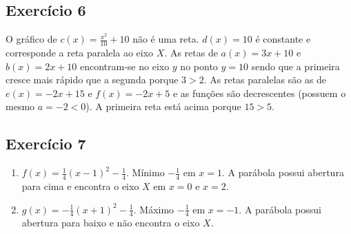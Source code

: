 \subsection*{Exercício 6}

O gráfico de $c(x)=\frac{x^2}{10} + 10$ não é uma reta.
$d(x) = 10$ é constante e corresponde a reta paralela ao eixo $X$.
As retas de $a(x) = 3 x + 10$ e $b(x) = 2 x + 10$ encontram-se no eixo $y$ no
ponto $y = 10$ sendo que a primeira cresce mais rápido que a segunda
porque $3 > 2$. As retas paralelas são as de $e(x) = -2x + 15$ e
$f(x) = -2x + 5$ e as funções são decrescentes (possuem o mesmo $a = -2 < 0$).
A primeira reta está acima porque $15 > 5$.

\subsection*{Exercício 7}

\begin{enumerate}
\item $f(x) = \frac{1}{4} \left(x-1\right)^2 - \frac{1}{4}$. Mínimo
$-\frac{1}{4}$ em $x = 1$. A parábola possui abertura para cima
e encontra o eixo $X$ em $x = 0$ e $x = 2$.
\item $g(x) = -\frac{1}{4} \left(x+1\right)^2 - \frac{1}{4}$. Máximo
$-\frac{1}{4}$ em $x = -1$. A parábola possui abertura para baixo
e não encontra o eixo $X$.
\end{enumerate}

\begin{center}
\end{center}
